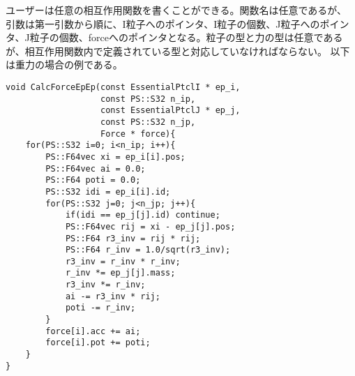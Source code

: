 ユーザーは任意の相互作用関数を書くことができる。関数名は任意であるが、
引数は第一引数から順に、I粒子へのポインタ、I粒子の個数、J粒子へのポイン
タ、J粒子の個数、forceへのポインタとなる。粒子の型と力の型は任意である
が、相互作用関数内で定義されている型と対応していなければならない。
以下は重力の場合の例である。

\begin{lstlisting}
void CalcForceEpEp(const EssentialPtclI * ep_i,
                   const PS::S32 n_ip,
                   const EssentialPtclJ * ep_j,
                   const PS::S32 n_jp,
                   Force * force){
    for(PS::S32 i=0; i<n_ip; i++){
        PS::F64vec xi = ep_i[i].pos;
        PS::F64vec ai = 0.0;
        PS::F64 poti = 0.0;
        PS::S32 idi = ep_i[i].id;
        for(PS::S32 j=0; j<n_jp; j++){
            if(idi == ep_j[j].id) continue;
            PS::F64vec rij = xi - ep_j[j].pos;
            PS::F64 r3_inv = rij * rij;
            PS::F64 r_inv = 1.0/sqrt(r3_inv);
            r3_inv = r_inv * r_inv;
            r_inv *= ep_j[j].mass;
            r3_inv *= r_inv;
            ai -= r3_inv * rij;
            poti -= r_inv;
        }
        force[i].acc += ai;
        force[i].pot += poti;
    }
}
\end{lstlisting}
